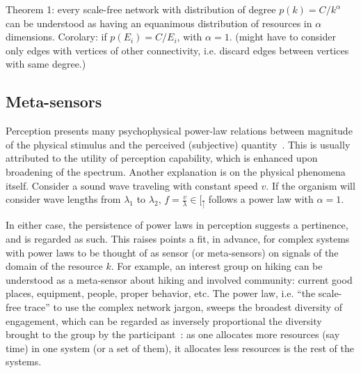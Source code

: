 \documentclass[a4paper, 11pt]{article} %
\begin{document}
Theorem 1: every scale-free network with distribution of degree $p(k)=C/k^\alpha$ can be understood as having an equanimous distribution of resources in $\alpha$ dimensions.
Corolary: if $p(E_i)=C/E_i$, with $\alpha=1$. (might have to consider only edges with vertices of other connectivity, i.e. discard edges between vertices with same degree.)

\subsection{Meta-sensors}
Perception presents many psychophysical power-law 
relations between
magnitude of the physical stimulus and the perceived 
(subjective) quantity~\cite{stev,web}.
This is usually attributed to the utility of perception capability,
which is enhanced upon broadening of the spectrum.
Another explanation is on the physical phenomena itself.
Consider a sound wave traveling with constant speed $v$.
If the organism will consider wave lengths from $\lambda_1$
to $\lambda_2$, $f=\frac{v}{\lambda} \in [\frac{}]$ follows
a power law with $\alpha=1$.

In either case, the persistence of power laws in perception
suggests a pertinence, and is regarded as such. This raises
points a fit, in advance, for complex systems with power laws
to be thought of as sensor (or meta-sensors) on signals
of the domain of the resource $k$.
For example, an interest group on hiking can be understood as
a meta-sensor about hiking and involved community: current good
places, equipment, people, proper behavior, etc.
The power law, i.e. ``the scale-free trace'' to use
the complex network jargon, sweeps the broadest 
diversity of engagement, which can be regarded as
inversely proportional the diversity brought to the group
by the participant~\cite{tStable}: 
as one allocates more resources (say time)
in one system (or a set of them),
it allocates less resources is the rest of the systems.
\end{document}
